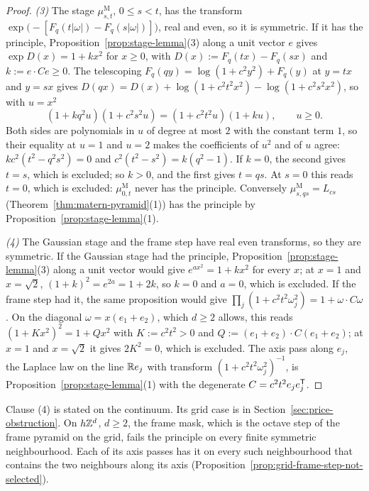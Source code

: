 \begin{proof}
\emph{(3)} The stage $\mu^{\mathrm M}_{s,t}$, $0 \le s < t$, has the transform
$\exp\bigl(-[F_q(t|\omega|) - F_q(s|\omega|)]\bigr)$, real and even, so it is symmetric. If it
has the principle, Proposition~\ref{prop:stage-lemma}(3) along a unit vector $e$ gives
$\exp D(x) = 1 + kx^2$ for $x \ge 0$, with $D(x) := F_q(tx) - F_q(sx)$ and
$k := e\cdot Ce \ge 0$. The telescoping $F_q(qy) = \log(1 + c^2y^2) + F_q(y)$ at $y = tx$ and
$y = sx$ gives $D(qx) = D(x) + \log(1 + c^2t^2x^2) - \log(1 + c^2s^2x^2)$, so with $u = x^2$
\[
  (1 + kq^2u)(1 + c^2s^2u) = (1 + c^2t^2u)(1 + ku) , \qquad u \ge 0 .
\]
Both sides are polynomials in $u$ of degree at most $2$ with the constant term $1$, so their equality at $u = 1$ and $u = 2$ makes the coefficients of $u^2$ and of $u$ agree:
$kc^2(t^2 - q^2s^2) = 0$ and $c^2(t^2 - s^2) = k(q^2 - 1)$. If $k = 0$, the second gives $t = s$,
which is excluded; so $k > 0$, and the first gives $t = qs$. At $s = 0$ this reads $t = 0$, which is
excluded: $\mu^{\mathrm M}_{0,t}$ never has the principle. Conversely
$\mu^{\mathrm M}_{s,qs} = L_{cs}$ (Theorem~\ref{thm:matern-pyramid}(1)) has the principle by
Proposition~\ref{prop:stage-lemma}(1).

\emph{(4)} The Gaussian stage and the frame step have real even transforms, so they are symmetric.
If the Gaussian stage had the principle, Proposition~\ref{prop:stage-lemma}(3) along a unit vector
would give $e^{ax^2} = 1 + kx^2$ for every $x$; at $x = 1$ and $x = \sqrt2$,
$(1 + k)^2 = e^{2a} = 1 + 2k$, so $k = 0$ and $a = 0$, which is excluded. If the frame step had it,
the same proposition would give $\prod_j(1 + c^2t^2\omega_j^2) = 1 + \omega\cdot C\omega$. On the
diagonal $\omega = x(e_1 + e_2)$, which $d \ge 2$ allows, this reads
$(1 + Kx^2)^2 = 1 + Qx^2$ with $K := c^2t^2 > 0$ and $Q := (e_1 + e_2)\cdot C(e_1 + e_2)$; at
$x = 1$ and $x = \sqrt2$ it gives $2K^2 = 0$, which is excluded. The axis pass along $e_j$, the
Laplace law on the line $\mathbb{R} e_j$ with transform $(1 + c^2t^2\omega_j^2)^{-1}$, is
Proposition~\ref{prop:stage-lemma}(1) with the degenerate $C = c^2t^2e_je_j^{\mathsf{T}}$.
\end{proof}

Clause (4) is stated on the continuum. Its grid case is in Section~\ref{sec:price-obstruction}. On
$h\mathbb{Z}^d$, $d \ge 2$, the frame mask, which is the octave step of the frame \Matern{} pyramid on the
grid, fails the principle on every finite symmetric neighbourhood. Each of its axis passes has it on
every such neighbourhood that contains the two neighbours along its axis
(Proposition~\ref{prop:grid-frame-step-not-selected}).

